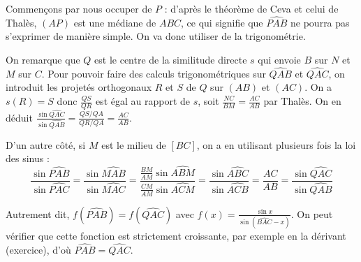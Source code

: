 \begin{sol}
Commençons par nous occuper de $P$ : d'après le th\'eorème de Ceva et celui de Thalès, $(AP)$  est une m\'ediane de $ABC$, ce qui signifie que $\widehat{PAB}$ ne pourra pas s'exprimer de manière simple. On va donc utiliser de la trigonom\'etrie.

On remarque que $Q$ est le centre de la similitude directe $s$ qui envoie $B$ sur $N$ et $M$ sur $C$. Pour pouvoir faire des calculs trigonom\'etriques sur $\widehat{QAB}$ et $\widehat{QAC}$, on introduit les projet\'es orthogonaux $R$ et $S$ de $Q$ sur $(AB)$ et $(AC)$. On a $s(R)=S$ donc $\frac{QS}{QR}$ est \'egal au rapport de $s$, soit $\frac{NC}{BM}=\frac{AC}{AB}$ par Thalès. On en d\'eduit $\frac{\sin{\widehat{QAC}}}{\sin{\widehat{QAB}}}=\frac{QS/QA}{QR/QA}=\frac{AC}{AB}$.

D'un autre c\^ot\'e, si $M$ est le milieu de $[BC]$, on a en utilisant plusieurs fois la loi des sinus :
\[ \frac{\sin{\widehat{PAB}}}{\sin{\widehat{PAC}}}=\frac{\sin{\widehat{MAB}}}{\sin{\widehat{MAC}}}=\frac{\frac{BM}{AM} \sin{\widehat{ABM}}}{\frac{CM}{AM} \sin{\widehat{ACM}}}=\frac{\sin{\widehat{ABC}}}{\sin{\widehat{ACB}}}=\frac{AC}{AB}=\frac{\sin{\widehat{QAC}}}{\sin{\widehat{QAB}}} \]

Autrement dit, $f(\widehat{PAB})=f(\widehat{QAC})$ avec $f(x)=\frac{\sin{x}}{\sin{ (\widehat{BAC}-x)}}$. On peut v\'erifier que cette fonction est strictement croissante, par exemple en la d\'erivant (exercice), d'o\`u $\widehat{PAB}=\widehat{QAC}$.
\end{sol}